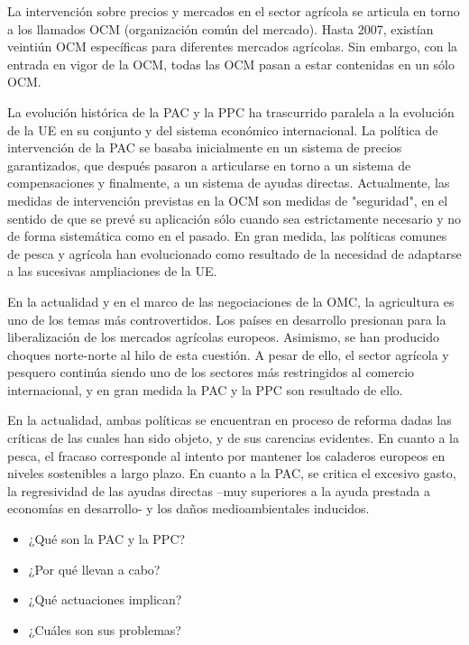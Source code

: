 \documentclass{nuevotema}
\begin{document}
La intervención sobre precios y mercados en el sector agrícola se articula en torno a los llamados OCM (organización común del mercado). Hasta 2007, existían veintiún OCM específicas para diferentes mercados agrícolas. Sin embargo, con la entrada en vigor de la OCM, todas las OCM pasan a estar contenidas en un sólo OCM. 

La evolución histórica de la PAC y la PPC ha trascurrido paralela a la evolución de la UE en su conjunto y del sistema económico internacional. La política de intervención de la PAC se basaba inicialmente en un sistema de precios garantizados, que después pasaron a articularse en torno a un sistema de compensaciones y finalmente, a un sistema de ayudas directas. Actualmente, las medidas de intervención previstas en la OCM son medidas de "seguridad", en el sentido de que se prevé su aplicación sólo cuando sea estrictamente necesario y no de forma sistemática como en el pasado. En gran medida, las políticas comunes de pesca y agrícola han evolucionado como resultado de la necesidad de adaptarse a las sucesivas ampliaciones de la UE. 

En la actualidad y en el marco de las negociaciones de la OMC, la agricultura es uno de los temas más controvertidos. Los países en desarrollo presionan para la liberalización de los mercados agrícolas europeos. Asimismo, se han producido choques norte-norte al hilo de esta cuestión. A pesar de ello, el sector agrícola y pesquero continúa siendo uno de los sectores más restringidos al comercio internacional, y en gran medida la PAC y la PPC son resultado de ello.

En la actualidad, ambas políticas se encuentran en proceso de reforma dadas las críticas de las cuales han sido objeto, y de sus carencias evidentes. En cuanto a la pesca, el fracaso corresponde al intento por mantener los caladeros europeos en niveles sostenibles a largo plazo. En cuanto a la PAC, se critica el excesivo gasto, la regresividad de las ayudas directas --muy superiores a la ayuda prestada a economías en desarrollo- y los daños medioambientales inducidos.


\begin{itemize}
    \item ¿Qué son la PAC y la PPC?
    \item ¿Por qué llevan a cabo?
    \item ¿Qué actuaciones implican?
    \item ¿Cuáles son sus problemas?
\end{itemize}
\end{document}
